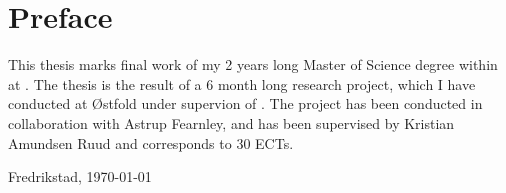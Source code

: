 \chapter*{Preface}

This thesis marks final work of my 2 years long Master of Science degree within \ProgramName at \DepartmentName. 
The thesis is the result of a 6 month long research project, which I have conducted at Østfold under supervion of \supervisorName. 
The project has been conducted in collaboration with Astrup Fearnley, and has been supervised by Kristian Amundsen Ruud and corresponds to  30 ECTs.

\vspace{30pt}


\begin{center}
    Fredrikstad, \today
    \vspace{40pt}

    \authorName
\end{center}
